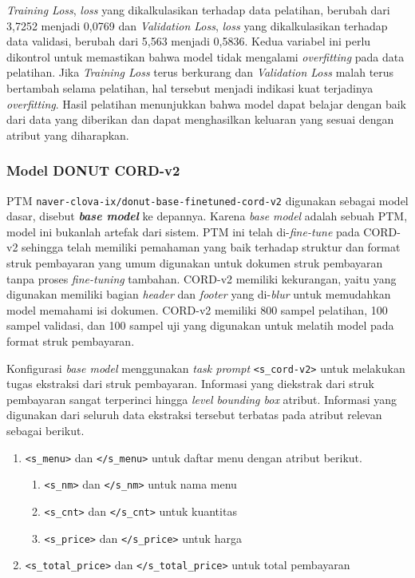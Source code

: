 \emph{Training Loss}, \emph{loss} yang dikalkulasikan terhadap data pelatihan, berubah dari 3,7252 menjadi 0,0769 dan \emph{Validation Loss}, \emph{loss} yang dikalkulasikan terhadap data validasi, berubah dari 5,563 menjadi 0,5836. Kedua variabel ini perlu dikontrol untuk memastikan bahwa model tidak mengalami \emph{overfitting} pada data pelatihan. Jika \emph{Training Loss} terus berkurang dan \emph{Validation Loss} malah terus bertambah selama pelatihan, hal tersebut menjadi indikasi kuat terjadinya \emph{overfitting}. Hasil pelatihan menunjukkan bahwa model dapat belajar dengan baik dari data yang diberikan dan dapat menghasilkan keluaran yang sesuai dengan atribut yang diharapkan.

\subsubsection{Model DONUT CORD-v2}
\label{subsubsec:model-base}

PTM \donut{} \texttt{naver-clova-ix/donut-base-finetuned-cord-v2} digunakan sebagai model dasar, disebut \textbf{\emph{base model}} ke depannya. Karena \emph{base model} adalah sebuah PTM, model ini bukanlah artefak dari sistem. PTM ini telah di-\emph{fine-tune} pada \dataset{} CORD-v2 sehingga telah memiliki pemahaman yang baik terhadap struktur dan format struk pembayaran yang umum digunakan untuk dokumen struk pembayaran tanpa proses \emph{fine-tuning} tambahan. \datasetfl{} CORD-v2 memiliki kekurangan, yaitu \dataset{} yang digunakan memiliki bagian \emph{header} dan \emph{footer} yang di-\emph{blur} untuk memudahkan model memahami isi dokumen. \datasetfl{} CORD-v2 memiliki 800 sampel pelatihan, 100 sampel validasi, dan 100 sampel uji yang digunakan untuk melatih model \donut{} pada format struk pembayaran.

Konfigurasi \emph{base model} menggunakan \emph{task prompt} \texttt{<s\_cord-v2>} untuk melakukan tugas ekstraksi dari struk pembayaran. Informasi yang diekstrak dari struk pembayaran sangat terperinci hingga \emph{level bounding box} atribut. Informasi yang digunakan dari seluruh data ekstraksi tersebut terbatas pada atribut relevan sebagai berikut.
\begin{enumerate}
    \item \texttt{<s\_menu>} dan \texttt{</s\_menu>} untuk daftar menu dengan atribut berikut.
    \begin{enumerate}
        \item \texttt{<s\_nm>} dan \texttt{</s\_nm>} untuk nama menu
        \item \texttt{<s\_cnt>} dan \texttt{</s\_cnt>} untuk kuantitas
        \item \texttt{<s\_price>} dan \texttt{</s\_price>} untuk harga
    \end{enumerate}
    \item \texttt{<s\_total\_price>} dan \texttt{</s\_total\_price>} untuk total pembayaran
\end{enumerate}

